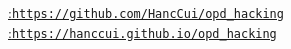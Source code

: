 %
\vspace{-12pt}
{\centering\small
  \href{https://github.com/HancCui/opd_hacking}{\textcolor[rgb]{0.19,0.36,0.47}{\faGithub\enspace:\enspace\nolinkurl{https://github.com/HancCui/opd_hacking}}}\\[3pt]
  \href{https://hanccui.github.io/opd_hacking}{\textcolor[rgb]{0.19,0.36,0.47}{\faGlobe\enspace:\enspace\nolinkurl{https://hanccui.github.io/opd_hacking}}}
  \par
}
\vspace{3pt}
